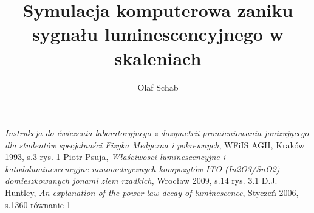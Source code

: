 \documentclass[a4paper,12pt,oneside]{book}
\title{Symulacja komputerowa zaniku sygnału luminescencyjnego w skaleniach}
\author{Olaf Schab}
\begin{document}







\begin{thebibliography}{wstep}

  \emph{Instrukcja do ćwiczenia laboratoryjnego z dozymetrii promieniowania jonizującego dla
studentów specjalności Fizyka Medyczna i pokrewnych}, WFiIS AGH, Kraków 1993, s.3 rys. 1
Piotr Psuja,
\emph{Właściwosci luminescencyjne i katodoluminescencyjne
nanometrycznych kompozytów ITO (In2O3/SnO2)
domieszkowanych jonami ziem rzadkich}, Wrocław 2009, s.14 rys. 3.1
D.J. Huntley,
\emph{An explanation of the power-law decay of
luminescence}, Styczeń 2006, s.1360 równanie 1



\end{thebibliography}
\end{document}
